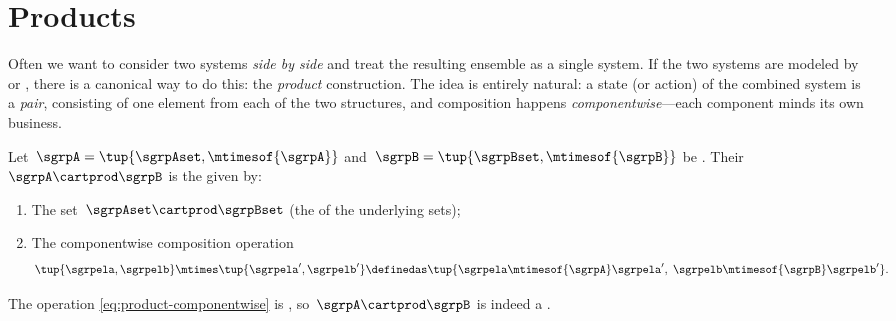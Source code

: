 
\section{Products}
\label{sec:products-algebra}


Often we want to consider two systems \emph{side by side} and treat the resulting ensemble as a single system.
If the two systems are modeled by  or , there is a canonical way to do this: the \emph{product} construction.
The idea is entirely natural: a state (or action) of the combined system is a \emph{pair}, consisting of one element from each of the two structures, and composition happens \emph{componentwise}---each component minds its own business.

\begin{ctdefinition}
    \label{def:product-semigroup}
    Let~$\sgrpA = \tup{\sgrpAset, \mtimesof{\sgrpA}}$ and~$\sgrpB = \tup{\sgrpBset, \mtimesof{\sgrpB}}$ be .
    Their ~$\sgrpA \cartprod \sgrpB$ is the  given by:

    \constit

    \begin{enumerate}
        \item The set~$\sgrpAset \cartprod \sgrpBset$ (the  of the underlying sets);
        \item The componentwise composition operation
              \begin{equation}
                  \label{eq:product-componentwise}
                  \tup{\sgrpela, \sgrpelb} \mtimes \tup{\sgrpela', \sgrpelb'}
                  \definedas
                  \tup{\sgrpela \mtimesof{\sgrpA} \sgrpela', \; \sgrpelb \mtimesof{\sgrpB} \sgrpelb'}.
              \end{equation}
    \end{enumerate}
\end{ctdefinition}

\begin{lemma}
    \label{lem:product-semigroup-associative}
    The operation \cref{eq:product-componentwise} is , so~$\sgrpA \cartprod \sgrpB$ is indeed a .
\end{lemma}

